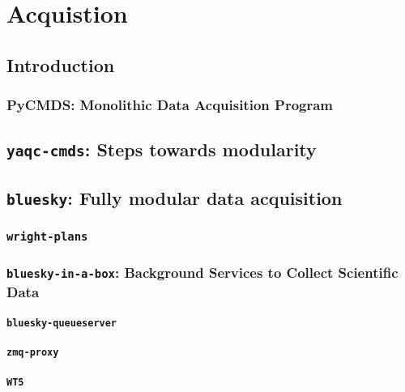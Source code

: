 \chapter{Acquistion} \label{cha:acq}

\clearpage

\section{Introduction}  %

\subsection{PyCMDS: Monolithic Data Acquisition Program}

\clearpage

\section{\texttt{yaqc-cmds}: Steps towards modularity}  %

\section{\texttt{bluesky}: Fully modular data acquisition}  %

\subsection{\texttt{wright-plans}}

\subsection{\texttt{bluesky-in-a-box}: Background Services to Collect Scientific Data}
\subsubsection{\texttt{bluesky-queueserver}}
\subsubsection{\texttt{zmq-proxy}}
\subsubsection{\texttt{WT5}}
